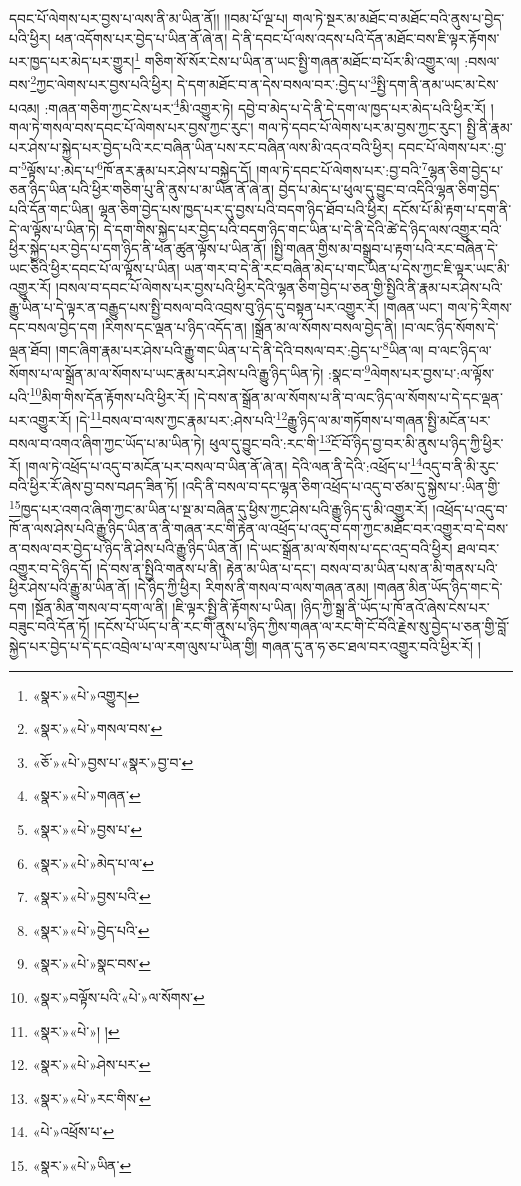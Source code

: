 དབང་པོ་ལེགས་པར་བྱས་པ་ལས་ནི་མ་ཡིན་ནོ།། །།བམ་པོ་ལྔ་པ། གལ་ཏེ་སྔར་མ་མཐོང་བ་མཐོང་བའི་ནུས་པ་བྱེད་པའི་ཕྱིར། ཕན་འདོགས་པར་བྱེད་པ་ཡིན་ནོ་ཞེ་ན། དེ་ནི་དབང་པོ་ལས་འདས་པའི་དོན་མཐོང་བས་ཇི་ལྟར་རྟོགས་པར་ཁྱད་པར་མེད་པར་གྱུར།\footnote{«སྣར་»«པེ་»འགྱུར།} གཅིག་སོ་སོར་ངེས་པ་ཡིན་ན་ཡང་སྤྱི་གཞན་མཐོང་བ་པོར་མི་འགྱུར་ལ། :བསལ་བས་\footnote{«སྣར་»«པེ་»གསལ་བས་}ཀྱང་ལེགས་པར་བྱས་པའི་ཕྱིར། དེ་དག་མཐོང་བ་ན་དེས་བསལ་བར་:བྱེད་པ་\footnote{«ཅོ་»«པེ་»བྱས་པ་«སྣར་»བྱ་བ་}སྤྱི་དག་ནི་ནམ་ཡང་མ་ངེས་པའམ། :གཞན་གཅིག་ཀྱང་ངེས་པར་\footnote{«སྣར་»«པེ་»གཞན་}མི་འགྱུར་ཏེ། དབྱེ་བ་མེད་པ་དེ་ནི་དེ་དག་ལ་ཁྱད་པར་མེད་པའི་ཕྱིར་རོ། །གལ་ཏེ་གསལ་བས་དབང་པོ་ལེགས་པར་བྱས་ཀྱང་རུང་། གལ་ཏེ་དབང་པོ་ལེགས་པར་མ་བྱས་ཀྱང་རུང་། སྤྱི་ནི་རྣམ་པར་ཤེས་པ་སྐྱེད་པར་བྱེད་པའི་རང་བཞིན་ཡིན་པས་རང་བཞིན་ལས་མི་འདའ་བའི་ཕྱིར། དབང་པོ་ལེགས་པར་:བྱ་བ་\footnote{«སྣར་»«པེ་»བྱས་པ་}ལྟོས་པ་:མེད་པ་\footnote{«སྣར་»«པེ་»མེད་པ་ལ་}ཁོ་ནར་རྣམ་པར་ཤེས་པ་བསྐྱེད་དོ། །གལ་ཏེ་དབང་པོ་ལེགས་པར་:བྱ་བའི་\footnote{«སྣར་»«པེ་»བྱས་པའི་}ལྷན་ཅིག་བྱེད་པ་ཅན་ཉིད་ཡིན་པའི་ཕྱིར་གཅིག་པུ་ནི་ནུས་པ་མ་ཡིན་ནོ་ཞེ་ན། བྱེད་པ་མེད་པ་ཕུལ་དུ་བྱུང་བ་འདིའི་ལྷན་ཅིག་བྱེད་པའི་དོན་གང་ཡིན། ལྷན་ཅིག་བྱེད་པས་ཁྱད་པར་དུ་བྱས་པའི་བདག་ཉིད་ཐོབ་པའི་ཕྱིར། དངོས་པོ་མི་རྟག་པ་དག་ནི་དེ་ལ་ལྟོས་པ་ཡིན་ཏེ། དེ་དག་གིས་སྐྱེད་པར་བྱེད་པའི་བདག་ཉིད་གང་ཡིན་པ་དེ་ནི་དེའི་ཚེ་དེ་ཉིད་ལས་འགྱུར་བའི་ཕྱིར་སྐྱེད་པར་བྱེད་པ་དག་ཉིད་ནི་ཕན་ཚུན་ལྟོས་པ་ཡིན་ནོ། །སྤྱི་གཞན་གྱིས་མ་བསྒྲུབ་པ་རྟག་པའི་རང་བཞིན་དེ་ཡང་ཅིའི་ཕྱིར་དབང་པོ་ལ་ལྟོས་པ་ཡིན། ཡན་གར་བ་དེ་ནི་རང་བཞིན་མེད་པ་གང་ཡིན་པ་དེས་ཀྱང་ཇི་ལྟར་ཡང་མི་འགྱུར་རོ། །བསལ་བ་དབང་པོ་ལེགས་པར་བྱས་པའི་ཕྱིར་དེའི་ལྷན་ཅིག་བྱེད་པ་ཅན་གྱི་སྤྱིའི་ནི་རྣམ་པར་ཤེས་པའི་རྒྱུ་ཡིན་པ་དེ་ལྟར་ན་བརྒྱུད་པས་སྤྱི་བསལ་བའི་འབྲས་བུ་ཉིད་དུ་བསྟན་པར་འགྱུར་རོ། །གཞན་ཡང་། གལ་ཏེ་རིགས་དང་བསལ་བྱེད་དག །རིགས་དང་ལྡན་པ་ཉིད་འདོད་ན། །སྒྲོན་མ་ལ་སོགས་བསལ་བྱེད་ནི། །བ་ལང་ཉིད་སོགས་དེ་ལྡན་ཐོབ། །གང་ཞིག་རྣམ་པར་ཤེས་པའི་རྒྱུ་གང་ཡིན་པ་དེ་ནི་དེའི་བསལ་བར་:བྱེད་པ་\footnote{«སྣར་»«པེ་»བྱེད་པའི་}ཡིན་ལ། བ་ལང་ཉིད་ལ་སོགས་པ་ལ་སྒྲོན་མ་ལ་སོགས་པ་ཡང་རྣམ་པར་ཤེས་པའི་རྒྱུ་ཉིད་ཡིན་ཏེ། :སྣང་བ་\footnote{«སྣར་»«པེ་»སྣང་བས་}ལེགས་པར་བྱས་པ་:ལ་ལྟོས་པའི་\footnote{«སྣར་»བལྟོས་པའི་«པེ་»ལ་སོགས་}མིག་གིས་དོན་རྟོགས་པའི་ཕྱིར་རོ། །དེ་བས་ན་སྒྲོན་མ་ལ་སོགས་པ་ནི་བ་ལང་ཉིད་ལ་སོགས་པ་དེ་དང་ལྡན་པར་འགྱུར་རོ། །དེ་\footnote{«སྣར་»«པེ་»། །}བསལ་བ་ལས་ཀྱང་རྣམ་པར་:ཤེས་པའི་\footnote{«སྣར་»«པེ་»ཤེས་པར་}རྒྱུ་ཉིད་ལ་མ་གཏོགས་པ་གཞན་སྤྱི་མངོན་པར་བསལ་བ་འགའ་ཞིག་ཀྱང་ཡོད་པ་མ་ཡིན་ཏེ། ཕུལ་དུ་བྱུང་བའི་:རང་གི་\footnote{«སྣར་»«པེ་»རང་གིས་}ངོ་བོ་ཉིད་བྱ་བར་མི་ནུས་པ་ཉིད་ཀྱི་ཕྱིར་རོ། །གལ་ཏེ་འཕྲོད་པ་འདུ་བ་མངོན་པར་བསལ་བ་ཡིན་ནོ་ཞེ་ན། དེའི་ལན་ནི་དེའི་:འཕྲོད་པ་\footnote{«པེ་»འཕྲོས་པ་}འདུ་བ་ནི་མི་རུང་བའི་ཕྱིར་རོ་ཞེས་བྱ་བས་བཤད་ཟིན་ཏོ། །འདི་ནི་བསལ་བ་དང་ལྷན་ཅིག་འཕྲོད་པ་འདུ་བ་ཙམ་དུ་སྐྱེས་པ་:ཡིན་གྱི་\footnote{«སྣར་»«པེ་»ཡིན་}ཁྱད་པར་འགའ་ཞིག་ཀྱང་མ་ཡིན་པ་སྔ་མ་བཞིན་དུ་ཕྱིས་ཀྱང་ཤེས་པའི་རྒྱུ་ཉིད་དུ་མི་འགྱུར་རོ། །འཕྲོད་པ་འདུ་བ་ཁོ་ན་ལས་ཤེས་པའི་རྒྱུ་ཉིད་ཡིན་ན་ནི་གཞན་རང་གི་རྟེན་ལ་འཕྲོད་པ་འདུ་བ་དག་ཀྱང་མཐོང་བར་འགྱུར་བ་དེ་བས་ན་བསལ་བར་བྱེད་པ་ཉིད་ནི་ཤེས་པའི་རྒྱུ་ཉིད་ཡིན་ནོ། །དེ་ཡང་སྒྲོན་མ་ལ་སོགས་པ་དང་འདྲ་བའི་ཕྱིར། ཐལ་བར་འགྱུར་བ་དེ་ཉིད་དོ། །དེ་བས་ན་སྤྱིའི་གནས་པ་ནི། རྟེན་མ་ཡིན་པ་དང་། བསལ་བ་མ་ཡིན་པས་ན་མི་གནས་པའི་ཕྱིར་ཤེས་པའི་རྒྱུ་མ་ཡིན་ནོ། །དེ་ཉིད་ཀྱི་ཕྱིར། རིགས་ནི་གསལ་བ་ལས་གཞན་ནམ། །གཞན་མིན་ཡོད་ཉིད་གང་དེ་དག །སྔོན་མིན་གསལ་བ་དག་ལ་ནི། །ཇི་ལྟར་སྤྱི་ནི་རྟོགས་པ་ཡིན། །ཉིད་ཀྱི་སྒྲ་ནི་ཡོད་པ་ཁོ་ནའོ་ཞེས་ངེས་པར་བཟུང་བའི་དོན་ཏོ། །དངོས་པོ་ཡོད་པ་ནི་རང་གི་ནུས་པ་ཉིད་ཀྱིས་གཞན་ལ་རང་གི་ངོ་བོའི་རྗེས་སུ་བྱེད་པ་ཅན་གྱི་བློ་སྐྱེད་པར་བྱེད་པ་དེ་དང་འབྲེལ་པ་ལ་རག་ལུས་པ་ཡིན་གྱི། གཞན་དུ་ན་ཧ་ཅང་ཐལ་བར་འགྱུར་བའི་ཕྱིར་རོ། །

